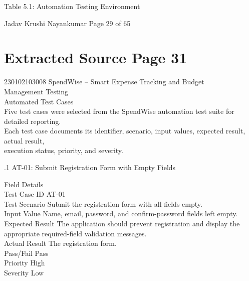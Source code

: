 \documentclass[12pt,a4paper]{report}
\begin{document}
\smallskip
Table 5.1: Automation Testing Environment\\ 

\smallskip

\smallskip

\smallskip
Jadav Krushi Nayankumar                                                        Page 29 of 65\\ 

\clearpage
\section*{Extracted Source Page 31}
230102103008                          SpendWise – Smart Expense Tracking and Budget\\ 
Management Testing\\ 

 Automated Test Cases\\ 

\smallskip
Five test cases were selected from the SpendWise automation test suite for detailed reporting.\\ 
Each test case documents its identifier, scenario, input values, expected result, actual result,\\ 
execution status, priority, and severity.\\ 

\smallskip

.1 AT-01: Submit Registration Form with Empty Fields\\ 

\smallskip

\smallskip
Field                    Details\\ 
Test Case ID             AT-01\\ 
Test Scenario            Submit the registration form with all fields empty.\\ 
Input Value              Name, email, password, and confirm-password fields left empty.\\ 
Expected Result          The application should prevent registration and display the\\ 
appropriate required-field validation messages.\\ 
Actual Result            The registration form.\\ 
Pass/Fail                Pass\\ 
Priority                 High\\ 
Severity                 Low\\ 
\end{document}
